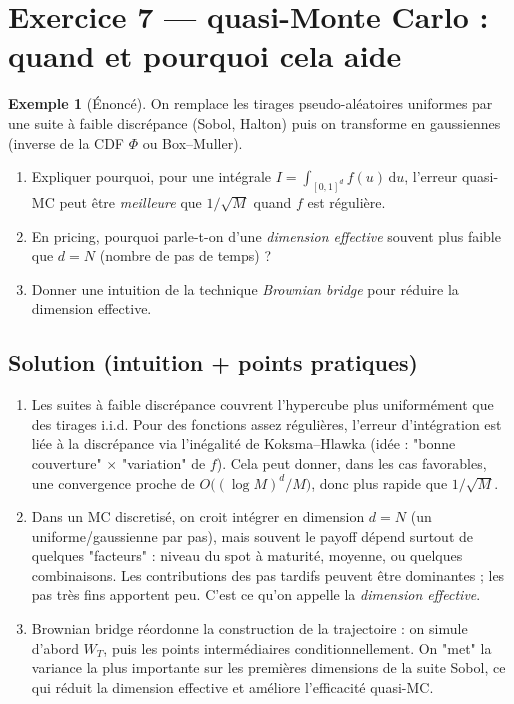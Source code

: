 \documentclass[11pt,a4paper]{report}
\newcommand{\dd}{\mathrm{d}}
\newcommand{\1}{\mathbbm{1}}
\theoremstyle{definition}
\newtheorem{example}{Exemple}[chapter]
\theoremstyle{plain}
\theoremstyle{remark}
\begin{document}
\section{Exercice 7 --- quasi-Monte Carlo : quand et pourquoi cela aide}
\begin{example}[Énoncé]
On remplace les tirages pseudo-aléatoires uniformes par une suite à faible discrépance (Sobol, Halton) puis on transforme en gaussiennes (inverse de la CDF $\Phi$ ou Box--Muller).
\begin{enumerate}[label=\alph*)]
  \item Expliquer pourquoi, pour une intégrale $I=\int_{[0,1]^d} f(u)\,\dd u$, l'erreur quasi-MC peut être \emph{meilleure} que $1/\sqrt{M}$ quand $f$ est régulière.
  \item En pricing, pourquoi parle-t-on d'une \emph{dimension effective} souvent plus faible que $d=N$ (nombre de pas de temps) ?
  \item Donner une intuition de la technique \emph{Brownian bridge} pour réduire la dimension effective.
\end{enumerate}
\end{example}

\subsection*{Solution (intuition + points pratiques)}
\begin{enumerate}[label=\alph*)]
  \item Les suites à faible discrépance couvrent l'hypercube plus uniformément que des tirages i.i.d.
  Pour des fonctions assez régulières, l'erreur d'intégration est liée à la discrépance via l'inégalité de Koksma--Hlawka (idée : "bonne couverture" $\times$ "variation" de $f$).
  Cela peut donner, dans les cas favorables, une convergence proche de $O\bigl((\log M)^d/M\bigr)$, donc plus rapide que $1/\sqrt{M}$.
  \item Dans un MC discretisé, on croit intégrer en dimension $d=N$ (un uniforme/gaussienne par pas), mais souvent le payoff dépend surtout de quelques "facteurs" :
  niveau du spot à maturité, moyenne, ou quelques combinaisons.
  Les contributions des pas tardifs peuvent être dominantes ; les pas très fins apportent peu.
  C'est ce qu'on appelle la \emph{dimension effective}.
  \item Brownian bridge réordonne la construction de la trajectoire : on simule d'abord $W_T$, puis les points intermédiaires conditionnellement.
  On "met" la variance la plus importante sur les premières dimensions de la suite Sobol, ce qui réduit la dimension effective et améliore l'efficacité quasi-MC.
\end{enumerate}
\end{document}
